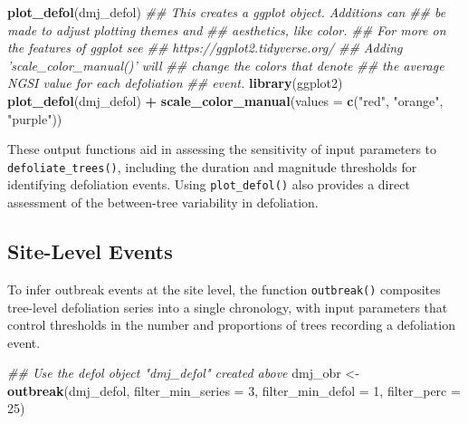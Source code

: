 \documentclass[review]{elsarticle} %
\newenvironment{Shaded}{\begin{snugshade}}{\end{snugshade}}
\newcommand{\CommentTok}[1]{\textcolor[rgb]{0.56,0.35,0.01}{\textit{#1}}}
\newcommand{\DataTypeTok}[1]{\textcolor[rgb]{0.13,0.29,0.53}{#1}}
\newcommand{\DecValTok}[1]{\textcolor[rgb]{0.00,0.00,0.81}{#1}}
\newcommand{\KeywordTok}[1]{\textcolor[rgb]{0.13,0.29,0.53}{\textbf{#1}}}
\newcommand{\NormalTok}[1]{#1}
\newcommand{\OperatorTok}[1]{\textcolor[rgb]{0.81,0.36,0.00}{\textbf{#1}}}
\newcommand{\StringTok}[1]{\textcolor[rgb]{0.31,0.60,0.02}{#1}}
\begin{document}
\begin{Shaded}
\begin{Highlighting}[]
\KeywordTok{plot_defol}\NormalTok{(dmj_defol)}
\CommentTok{## This creates a ggplot object. Additions can }
\CommentTok{## be made to adjust plotting themes and}
\CommentTok{## aesthetics, like color.   }
\CommentTok{## For more on the features of ggplot see}
\CommentTok{## https://ggplot2.tidyverse.org/}
\CommentTok{## Adding 'scale_color_manual()' will}
\CommentTok{## change the colors that denote }
\CommentTok{## the average NGSI value for each defoliation}
\CommentTok{## event.}
\KeywordTok{library}\NormalTok{(ggplot2)}
\KeywordTok{plot_defol}\NormalTok{(dmj_defol) }\OperatorTok{+}
\StringTok{  }\KeywordTok{scale_color_manual}\NormalTok{(}\DataTypeTok{values =} \KeywordTok{c}\NormalTok{(}\StringTok{"red"}\NormalTok{, }\StringTok{"orange"}\NormalTok{, }\StringTok{"purple"}\NormalTok{))}
\end{Highlighting}
\end{Shaded}

These output functions aid in assessing the sensitivity of input parameters to \texttt{defoliate\_trees()}, including the duration and magnitude thresholds for identifying defoliation events. Using \texttt{plot\_defol()} also provides a direct assessment of the between-tree variability in defoliation.

\hypertarget{site-level-events}{%
\subsection{Site-Level Events}\label{site-level-events}}

To infer outbreak events at the site level, the function \texttt{outbreak()} composites tree-level defoliation series into a single chronology, with input parameters that control thresholds in the number and proportions of trees recording a defoliation event.

\begin{Shaded}
\begin{Highlighting}[]
\CommentTok{## Use the defol object "dmj_defol" created above}
\NormalTok{dmj_obr <-}\StringTok{ }\KeywordTok{outbreak}\NormalTok{(dmj_defol,}
                    \DataTypeTok{filter_min_series =} \DecValTok{3}\NormalTok{,}
                    \DataTypeTok{filter_min_defol =} \DecValTok{1}\NormalTok{,}
                    \DataTypeTok{filter_perc =} \DecValTok{25}\NormalTok{)}
\end{Highlighting}
\end{Shaded}
\end{document}
